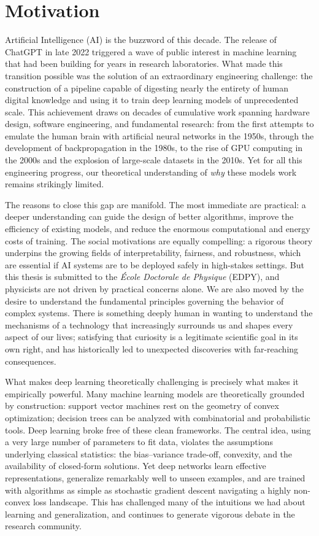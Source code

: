 \section{Motivation}
\label{intro:sec:motivation}

Artificial Intelligence (AI) is the buzzword of this decade.
The release of ChatGPT in late 2022 triggered a wave of public interest in machine
learning that had been building for years in research laboratories.
What made this transition possible was the solution of an extraordinary engineering
challenge: the construction of a pipeline capable of digesting nearly the entirety
of human digital knowledge and using it to train deep learning models of
unprecedented scale.
This achievement draws on decades of cumulative work spanning hardware design,
software engineering, and fundamental research: from the first attempts to emulate
the human brain with artificial neural networks in the 1950s, through the
development of backpropagation in the 1980s, to the rise of GPU computing in the
2000s and the explosion of large-scale datasets in the 2010s.
Yet for all this engineering progress, our theoretical understanding of \emph{why}
these models work remains strikingly limited.

The reasons to close this gap are manifold.
The most immediate are practical: a deeper understanding can guide the design of
better algorithms, improve the efficiency of existing models, and reduce the
enormous computational and energy costs of training.
The social motivations are equally compelling: a rigorous theory underpins the
growing fields of interpretability, fairness, and robustness, which are essential
if AI systems are to be deployed safely in high-stakes settings.
But this thesis is submitted to the \emph{École Doctorale de Physique} (EDPY), and
physicists are not driven by practical concerns alone.
We are also moved by the desire to understand the fundamental principles governing
the behavior of complex systems.
There is something deeply human in wanting to understand the mechanisms of a
technology that increasingly surrounds us and shapes every aspect of our lives;
satisfying that curiosity is a legitimate scientific goal in its own right, and has
historically led to unexpected discoveries with far-reaching consequences.

What makes deep learning theoretically challenging is precisely what makes it
empirically powerful.
Many machine learning models are theoretically grounded by construction: support
vector machines rest on the geometry of convex optimization; decision trees can be
analyzed with combinatorial and probabilistic tools.
Deep learning broke free of these clean frameworks.
The central idea, using a very large number of parameters to fit data, violates
the assumptions underlying classical statistics: the bias--variance trade-off,
convexity, and the availability of closed-form solutions.
Yet deep networks learn effective representations, generalize remarkably well to
unseen examples, and are trained with algorithms as simple as stochastic gradient
descent navigating a highly non-convex loss landscape.
This has challenged many of the intuitions we had about learning and generalization,
and continues to generate vigorous debate in the research community.

